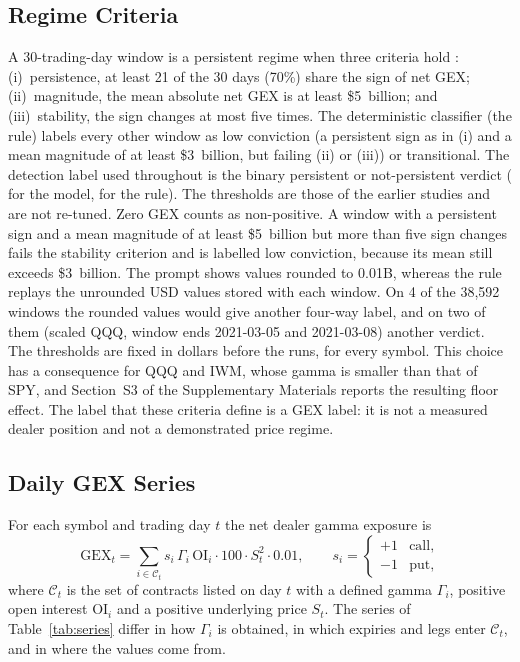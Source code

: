 \subsection{Regime Criteria}
\label{sec:methods:criteria}

A 30-trading-day window is a persistent regime when three criteria hold \cite{regan2026regimes,regan2026jrfm}: (i)~persistence, at least 21 of the 30 days (70\%) share the sign of net GEX; (ii)~magnitude, the mean absolute net GEX is at least \$5~billion; and (iii)~stability, the sign changes at most five times. The deterministic classifier (the rule) labels every other window as low conviction (a persistent sign as in (i) and a mean magnitude of at least \$3~billion, but failing (ii) or (iii)) or transitional. The detection label used throughout is the binary persistent or not-persistent verdict ( for the model,  for the rule). The thresholds are those of the earlier studies and are not re-tuned.
Zero GEX counts as non-positive. A window with a persistent sign and a mean magnitude of at least \$5~billion but more than five sign changes fails the stability criterion and is labelled low conviction, because its mean still exceeds \$3~billion. The prompt shows values rounded to 0.01B, whereas the rule replays the unrounded USD values stored with each window. On 4 of the 38{,}592 windows the rounded values would give another four-way label, and on two of them (scaled QQQ, window ends 2021-03-05 and 2021-03-08) another verdict. The thresholds are fixed in dollars before the runs, for every symbol. This choice has a consequence for QQQ and IWM, whose gamma is smaller than that of SPY, and Section~S3 of the Supplementary Materials reports the resulting floor effect. The label that these criteria define is a GEX label: it is not a measured dealer position and not a demonstrated price regime.

\subsection{Daily GEX Series}
\label{sec:methods:series}

For each symbol and trading day $t$ the net dealer gamma exposure is
\begin{equation}
\mathrm{GEX}_t=\sum_{i\in\mathcal{C}_t} s_i\,\Gamma_i\,\mathrm{OI}_i\cdot 100\cdot S_t^{2}\cdot 0.01,
\qquad s_i=\begin{cases}+1 & \text{call,}\\ -1 & \text{put,}\end{cases}
\label{eq:gex}
\end{equation}
where $\mathcal{C}_t$ is the set of contracts listed on day $t$ with a defined gamma $\Gamma_i$, positive open interest $\mathrm{OI}_i$ and a positive underlying price $S_t$. The series of Table~\ref{tab:series} differ in how $\Gamma_i$ is obtained, in which expiries and legs enter $\mathcal{C}_t$, and in where the values come from.

